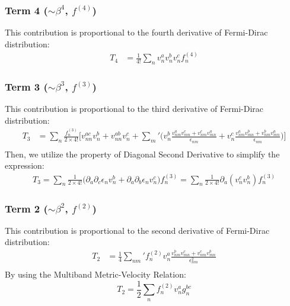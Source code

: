 \documentclass[twocolumn, prx, reprint, amsfonts, amsmath, amssymb, longbibliography, floatfix, aps]{revtex4-2}
\begin{document}
\subsubsection*{Term 4 (\texorpdfstring{$\sim \beta^4$}{~beta4}, \texorpdfstring{$f^{(4)}$}{f4})}
This contribution is proportional to the fourth derivative of Fermi-Dirac distribution:
\begin{equation}
	\begin{aligned}
		T_4 
		&= \frac{1}{4!} {\textstyle \sum_{n}} v^a_{n}v^{b}_{n}v^c_{n} f^{(4)}_n
        \label{s-rec-T4}
	\end{aligned}
\end{equation}

\subsubsection*{Term 3 (\texorpdfstring{$\sim \beta^3$}{beta3}, \texorpdfstring{$f^{(3)}$}{f3})}
This contribution is proportional to the third derivative of Fermi-Dirac distribution:
\begin{equation}
	\begin{aligned}
		T_3 
		&= {\textstyle \sum_{n}} \frac{f^{(3)}_n}{2\times 4!}  \Big[v^{ac}_{nn}v^b_{n} + v^{ab}_{nn}v^c_{n} + {\textstyle \sum_{m}'}\Big(v^b_{n}\frac{v^a_{nm}v^c_{mn}+v^c_{nm}v^a_{mn}}{\epsilon_{nm}} + v^c_{n}\frac{v^a_{nm}v^b_{mn}+v^b_{nm}v^a_{mn}}{\epsilon_{nm}}\Big) \Big] \\
	\end{aligned}
\end{equation}
Then, we utilize the property of Diagonal Second Derivative to simplify the expression:
\begin{equation}
	\begin{aligned}
		T_3 =  {\textstyle \sum_{n}} \frac{1}{2\times 4!}  \Big(\partial_a \partial_c \epsilon_n v^b_{n} + \partial_a \partial_b \epsilon_n v^c_{n}\Big)f^{(3)}_n
		= {\textstyle \sum_{n}}\frac{1}{2\times 4!}  \partial_a (v^c_{n} v^b_{n})f^{(3)}_n
	\end{aligned}
\end{equation}

\subsubsection*{Term 2 (\texorpdfstring{$\sim \beta^2$}{beta2}, \texorpdfstring{$f^{(2)}$}{f2})}
This contribution is proportional to the second derivative of Fermi-Dirac distribution:
\begin{equation}
	\begin{aligned}
		T_2 
		&= \frac{1}{4} {\textstyle \sum_{nm}'} f^{(2)}_n v^a_{n} \frac{v^b_{nm}v^c_{mn}+v^c_{nm}v^b_{mn}}{\epsilon^2_{nm}} \\
	\end{aligned}
\end{equation}
By using the Multiband Metric-Velocity Relation:
\begin{equation}
	T_2 = \frac{1}{2}{\textstyle \sum_{n}}f^{(2)}_n v^a_n g^{bc}_n
\end{equation}
\end{document}
